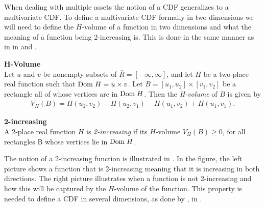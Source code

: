 When dealing with multiple assets the notion of a \gls{CDF} generalizes to a multivariate \gls{CDF}. To define a multivariate \gls{CDF} formally in two dimensions we will need to define the $H$-volume of a function in two dimensions and what the meaning of a function being 2-increasing is. This is done in the same manner as in  in  and .

\begin{definition}\label{def:H-volume} \textbf{H-Volume} \\
    Let $u$ and $v$ be nonempty subsets of $\bar{R} = [-\infty, \infty]$, and let $H$ be a two-place real function such that $\mathrm{Dom \;} H = u\times v$. Let $B = [u_1,u_2]\times[v_1,v_2]$  be a rectangle all of whose vertices are in $\mathrm{Dom \;} H$. Then
    the \emph{H-volume} of $B$ is given by
    \begin{align*}
        V_H(B) = H(u_2,v_2) - H(u_2,v_1) - H(u_1,v_2) + H(u_1,v_1).
    \end{align*}
\end{definition}

\begin{definition}\label{def:2-Increasing} \textbf{2-increasing} \\
     A 2-place real function $H$ is \emph{2-increasing} if its $H$-volume $V_H(B)\geq0$, for all rectangles B whose vertices lie in $\mathrm{Dom \;} H$.
\end{definition}

The notion of a 2-increasing function is illustrated in . In the figure, the left picture shows a function that is 2-increasing meaning that it is increasing in both directions. The right picture illustrates when a function is not 2-increasing and how this will be captured by the $H$-volume of the function. This property is needed to define a \gls{CDF} in several dimensions, as done by , in . 

